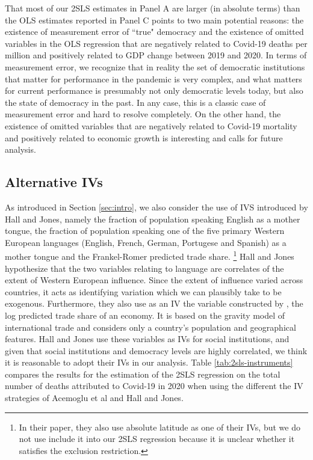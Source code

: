That most of our 2SLS estimates in Panel A are larger (in absolute terms) than the OLS estimates reported in Panel C points to two main potential reasons: the existence of measurement error of ``true" democracy and the existence of omitted variables in the OLS regression that are negatively related to Covid-19 deaths per million and positively related to GDP change between 2019 and 2020. In terms of measurement error, we recognize that in reality the set of democratic institutions that matter for performance in the pandemic is very complex, and what matters for current performance is presumably not only democratic levels today, but also the state of democracy in the past. In any case, this is a classic case of measurement error and hard to resolve completely. On the other hand, the existence of omitted variables that are negatively related to Covid-19 mortality and positively related to economic growth is interesting and calls for future analysis. 

\subsection{Alternative IVs}

As introduced in Section \ref{sec:intro}, we also consider the use of IVS introduced by Hall and Jones, namely the fraction of population speaking English as a mother tongue, the fraction of population speaking one of the five primary Western European languages (English, French, German, Portugese and Spanish) as a mother tongue and the Frankel-Romer predicted trade share. \footnote{In their paper, they also use absolute latitude as one of their IVs, but we do not use include it into our 2SLS regression because it is unclear whether it satisfies the exclusion restriction.} Hall and Jones hypothesize that the two variables relating to language are correlates of the extent of Western European influence. Since the extent of influence varied across countries, it acts as identifying variation which we can plausibly take to be exogenous. Furthermore, they also use as an IV the variable constructed by \textcite{frankelromer}, the log predicted trade share of an economy. It is based on the gravity model of international trade and considers only a country's population and geographical features. Hall and Jones use these variables as IVs for social institutions, and given that social institutions and democracy levels are highly correlated, we think it is reasonable to adopt their IVs in our analysis. 
Table \ref{tab:2sls-instruments} compares the results for the estimation of the 2SLS regression on the total number of deaths attributed to Covid-19 in 2020 when using the different the IV strategies of Acemoglu et al and Hall and Jones. 

